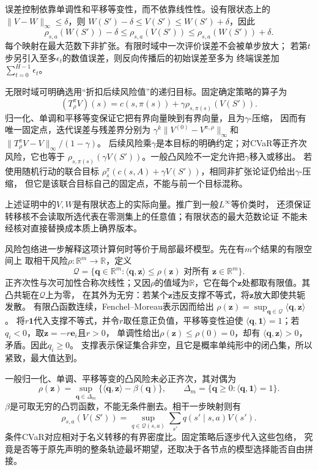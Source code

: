 误差控制依靠单调性和平移等变性，而不依靠线性性。设有限状态上的
$\lVert V-W\rVert_\infty\leq\delta$，则
$W(S')-\delta\leq V(S')\leq W(S')+\delta$，因此
\[
  \rho_{s,a}(W(S'))-\delta
  \leq\rho_{s,a}(V(S'))
  \leq\rho_{s,a}(W(S'))+\delta.
\]
每个映射在最大范数下非扩张。有限时域中一次评价误差不会被单步放大；
若第$t$步另引入至多$\epsilon_t$的数值误差，则反向传播后的初始误差至多为
终端误差加$\sum_{t=0}^{H-1}\epsilon_t$。

无限时域可明确选用“折扣后续风险值”的递归目标。固定确定策略的算子为
\[
  (T^\pi_\rho V)(s)
  =c(s,\pi(s))+\gamma\rho_{s,\pi(s)}(V(S')).
\]
归一化、单调和平移等变保证它把有界向量映到有界向量，且为$\gamma$-压缩，
因而有唯一固定点，迭代误差与残差界分别为
$\gamma^k\lVert V^{(0)}-V^{\pi,\rho}\rVert_\infty$和
$\lVert T^\pi_\rho V-V\rVert_\infty/(1-\gamma)$。
后续风险乘$\gamma$是本目标的明确约定；对CVaR等正齐次风险，它也等于
$\rho_{s,\pi(s)}(\gamma V(S'))$。一般凸风险不一定允许把$\gamma$移入或移出。
若使用随机行动的联合目标
$\rho^\pi_s(c(s,A)+\gamma V(S'))$，相同非扩张论证仍给出$\gamma$-压缩，
但它是该联合目标自己的固定点，不能与前一个目标混称。

上述证明中的$V,W$是有限状态上的实际向量。推广到一般$L^\infty$等价类时，
还须保证转移核不会读取所选代表在零测集上的任意值；有限状态的最大范数论证
不能未经核对直接替换成本质上确界版本。

风险包络进一步解释这项计算何时等价于局部最坏模型。先在有$m$个结果的有限空间上
取相干风险$\rho:\mathbb R^m\to\mathbb R$，定义
\[
  \mathcal Q=\{\bm q\in\mathbb R^m:
    \langle\bm q,\bm z\rangle\leq\rho(\bm z)
    \text{ 对所有 }\bm z\in\mathbb R^m\}.
\]
正齐次性与次可加性合称次线性；又因$\rho$的值域为$\mathbb R$，它在每个$\bm z$处都取有限值。其凸共轭在$\mathcal Q$上为零，
在其外为无穷：若某个$\bm z$违反支撑不等式，将$\bm z$放大即使共轭发散。
有限凸函数连续，Fenchel--Moreau表示因而给出
$\rho(\bm z)=\sup_{\bm q\in\mathcal Q}\langle\bm q,\bm z\rangle$。
将$r\bm 1$代入支撑不等式，并令$r$取任意正负值，平移等变性迫使
$\langle\bm q,\bm1\rangle=1$；若$q_i<0$，取$\bm z=-r\bm e_i$且$r>0$，
单调性给出$\rho(\bm z)\leq\rho(0)=0$，却有
$\langle\bm q,\bm z\rangle>0$，矛盾。因此$q_i\geq0$。
支撑表示保证集合非空，且它是概率单纯形中的闭凸集，所以紧致，最大值达到。

一般归一化、单调、平移等变的凸风险未必正齐次，其对偶为
\[
  \rho(\bm z)=\sup_{\bm q\in\Delta_m}
  \{\langle\bm q,\bm z\rangle-\beta(\bm q)\},\qquad
  \Delta_m=\{\bm q\geq0:\langle\bm q,\bm1\rangle=1\}.
\]
$\beta$是可取无穷的凸罚函数，不能无条件删去。相干一步映射则有
\begin{equation}
  \rho_{s,a}(V(S'))
  =\sup_{q\in\mathcal Q(s,a)}
    \sum_{s'}q(s'\mid s,a)V(s').
  \label{eq:decision-one-step-risk-envelope}
\end{equation}
条件CVaR对应相对于名义转移的有界密度比。固定策略后逐步代入这些包络，
究竟是否等于原先声明的整条轨迹最坏期望，还取决于各节点的模型选择能否自由拼接。

